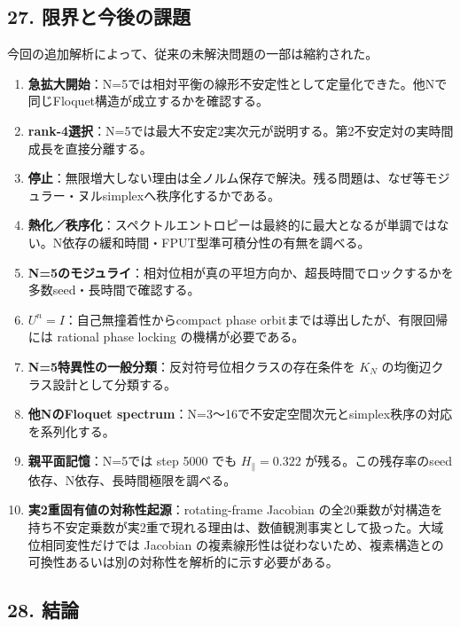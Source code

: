 \documentclass[
  a4paper,
]{ltjsarticle}
\providecommand{\tightlist}{%
  \setlength{\itemsep}{0pt}\setlength{\parskip}{0pt}}
\begin{document}
\subsection{27.
限界と今後の課題}\label{ux9650ux754cux3068ux4ecaux5f8cux306eux8ab2ux984c}

今回の追加解析によって、従来の未解決問題の一部は縮約された。

\begin{enumerate}
\def\labelenumi{\arabic{enumi}.}
\tightlist
\item
  \textbf{急拡大開始}：N=5では相対平衡の線形不安定性として定量化できた。他Nで同じFloquet構造が成立するかを確認する。
\item
  \textbf{rank-4選択}：N=5では最大不安定2実次元が説明する。第2不安定対の実時間成長を直接分離する。
\item
  \textbf{停止}：無限増大しない理由は全ノルム保存で解決。残る問題は、なぜ等モジュラー・ヌルsimplexへ秩序化するかである。
\item
  \textbf{熱化／秩序化}：スペクトルエントロピーは最終的に最大となるが単調ではない。N依存の緩和時間・FPUT型準可積分性の有無を調べる。
\item
  \textbf{N=5のモジュライ}：相対位相が真の平坦方向か、超長時間でロックするかを多数seed・長時間で確認する。
\item
  \textbf{\(U^n=I\)}：自己無撞着性からcompact phase
  orbitまでは導出したが、有限回帰には rational phase locking
  の機構が必要である。
\item
  \textbf{N=5特異性の一般分類}：反対符号位相クラスの存在条件を \(K_N\)
  の均衡辺クラス設計として分類する。
\item
  \textbf{他NのFloquet
  spectrum}：N=3〜16で不安定空間次元とsimplex秩序の対応を系列化する。
\item
  \textbf{親平面記憶}：N=5では step 5000 でも \(H_\parallel=0.322\)
  が残る。この残存率のseed依存、N依存、長時間極限を調べる。
\item
  \textbf{実2重固有値の対称性起源}：rotating-frame Jacobian
  の全20乗数が対構造を持ち不安定乗数が実2重で現れる理由は、数値観測事実として扱った。大域位相同変性だけでは
  Jacobian
  の複素線形性は従わないため、複素構造との可換性あるいは別の対称性を解析的に示す必要がある。
\end{enumerate}

\subsection{28. 結論}\label{ux7d50ux8ad6}
\end{document}
